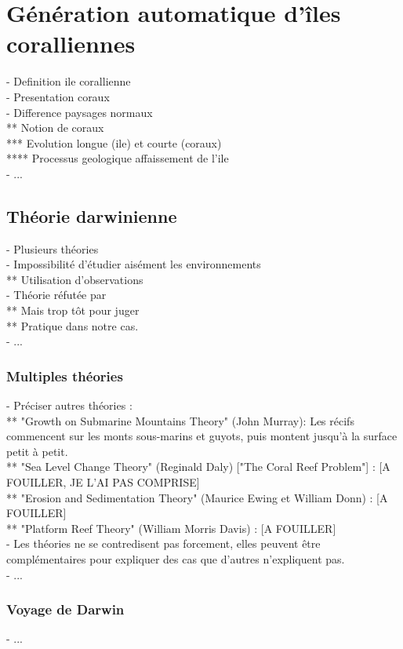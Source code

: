 \chapter{Génération automatique d'îles coralliennes}
\minitoc

- Definition ile corallienne \\
- Presentation coraux \\
- Difference paysages normaux \\
** Notion de coraux \\
*** Evolution longue (ile) et courte (coraux) \\
**** Processus geologique affaissement de l'ile \\
- ...

\section{Théorie darwinienne}
- Plusieurs théories \\
- Impossibilité d'étudier aisément les environnements \\
** Utilisation d'observations \\
- Théorie réfutée par \cite{Droxler2021} \\
** Mais trop tôt pour juger \\
** Pratique dans notre cas. \\
- ...

\subsection{Multiples théories}
- Préciser autres théories : \\
** "Growth on Submarine Mountains Theory" (John Murray): Les récifs commencent sur les monts sous-marins et guyots, puis montent jusqu'à la surface petit à petit. \\
** "Sea Level Change Theory" (Reginald Daly) ["The Coral Reef Problem"] \cite{Daly1915}  : [A FOUILLER, JE L'AI PAS COMPRISE] \\
** "Erosion and Sedimentation Theory" (Maurice Ewing et William Donn) : [A FOUILLER] \\
** "Platform Reef Theory" (William Morris Davis) : [A FOUILLER] \\
- Les théories ne se contredisent pas forcement, elles peuvent être complémentaires pour expliquer des cas que d'autres n'expliquent pas. \\
- ...

\subsection{Voyage de Darwin}
- ...

